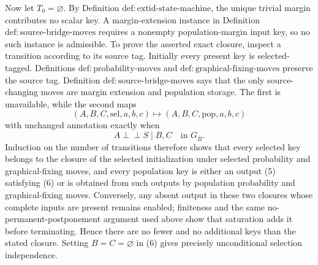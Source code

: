 Now let \(T_0=\varnothing\).  By Definition \(\mathrm{def{:}extid\text{-}state\text{-}machine}\), the unique trivial margin contributes no scalar key.  A margin-extension instance in Definition \(\mathrm{def{:}source\text{-}bridge\text{-}moves}\) requires a nonempty population-margin input key, so no such instance is admissible.  To prove the asserted exact closure, inspect a transition according to its source tag.  Initially every present key is selected-tagged.  Definitions \(\mathrm{def{:}probability\text{-}moves}\) and \(\mathrm{def{:}graphical\text{-}fixing\text{-}moves}\) preserve the source tag.  Definition \(\mathrm{def{:}source\text{-}bridge\text{-}moves}\) says that the only source-changing moves are margin extension and population storage.  The first is unavailable, while the second maps
\[
(A,B,C,\mathrm{sel},a,b,c)
\longmapsto
(A,B,C,\mathrm{pop},a,b,c) \tag{5}
\]
with unchanged annotation exactly when
\[
A\perp\!\!\!\perp S\mid B,C
\quad\text{in }G_{\overline B}. \tag{6}
\]
Induction on the number of transitions therefore shows that every selected key belongs to the closure of the selected initialization under selected probability and graphical-fixing moves, and every population key is either an output (5) satisfying (6) or is obtained from such outputs by population probability and graphical-fixing moves.  Conversely, any absent output in these two closures whose complete inputs are present remains enabled; finiteness and the same no-permanent-postponement argument used above show that saturation adds it before terminating.  Hence there are no fewer and no additional keys than the stated closure.  Setting \(B=C=\varnothing\) in (6) gives precisely unconditional selection independence.

